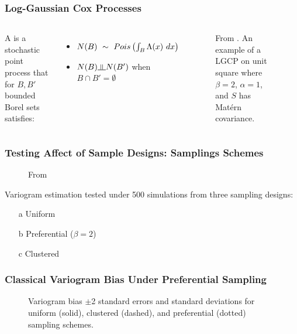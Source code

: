 \documentclass[xcolor=svgnames]{beamer}
\begin{document}
\begin{frame}
\frametitle{Log-Gaussian Cox Processes}

\begin{columns}[l]

\column{.05in}
\column{2.45in}
A  is a stochastic point process that for $B, B'$ bounded Borel sets satisfies:
\begin{itemize}
\item $N(B)~\sim~\Pois{\int_B \Lambda(x) \ dx}$
\item $N(B) \indep N(B')$ when $B \cap B' = \emptyset$
\end{itemize}

\column{2.45in}

\begin{figure}
\centering
{}
\caption{From \citealt{diggle2010}.  An example of a LGCP on unit square where $\beta=2$, $\alpha=1$, and $S$ has Mat\'{e}rn covariance.}
\end{figure}

\column{.05in}

\end{columns}

\end{frame}
\begin{frame}
\frametitle{Testing Affect of Sample Designs: Samplings Schemes}
\begin{figure}
\centering
{}
\caption{From \citealt{diggle2010}}
\end{figure}
Variogram estimation tested under 500 simulations from three sampling designs:
\begin{enumerate}
\item[a] Uniform
\item[b] Preferential ($\beta=2$)
\item[c] Clustered
\end{enumerate}

\end{frame}
\begin{frame}
\frametitle{Classical Variogram Bias Under Preferential Sampling}
\begin{figure}
\centering
\vspace{-.0in}
\vspace{-.0in}
\caption{Variogram bias $\pm$2 standard errors and standard deviations for uniform (solid), clustered (dashed), and preferential (dotted) sampling schemes.}
\end{figure}

\end{frame}
\end{document}
